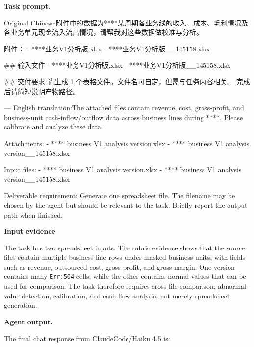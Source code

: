 \documentclass{llmxive}
\providecommand{\inlinett}[1]{{\footnotesize\texttt{#1}}}
\providecommand{\caseheader}[1]{\noindent\colorbox{fbcaseblue}{\parbox{0.96\linewidth}{\bfseries #1}}\vspace{0.5mm}\newline}
\begin{document}
\caseheader{Task prompt.}
\begin{casebox}\scriptsize
\begin{caselines}
Original Chinese:\nopagebreak[4]
附件中的数据为****某周期各业务线的收入、成本、毛利情况及各业务单元现金流入流出情况，请帮我对这些数据做校准与分析。

附件：
- ****业务V1分析版.xlsx
- ****业务V1分析版\_\_145158.xlsx

\#\# 输入文件
- ****业务V1分析版.xlsx
- ****业务V1分析版\_\_145158.xlsx

\#\# 交付要求
请生成 1 个表格文件。文件名可自定，但需与任务内容相关。
完成后请简短说明产物路径。

---
English translation:\nopagebreak[4]
The attached files contain revenue, cost, gross-profit, and business-unit cash-inflow/outflow data across business lines during ****. Please calibrate and analyze these data.

Attachments:
- **** business V1 analysis version.xlsx
- **** business V1 analysis version\_\_145158.xlsx

Input files:
- **** business V1 analysis version.xlsx
- **** business V1 analysis version\_\_145158.xlsx

Deliverable requirement:
Generate one spreadsheet file. The filename may be chosen by the agent but should be relevant to the task. Briefly report the output path when finished.
\end{caselines}
\end{casebox}

\caseheader{Input evidence}
The task has two spreadsheet inputs. The rubric evidence shows that the source files contain multiple business-line rows under masked business units, with fields such as revenue, outsourced cost, gross profit, and gross margin. One version contains many \inlinett{Err:504} cells, while the other contains normal values that can be used for comparison. The task therefore requires cross-file comparison, abnormal-value detection, calibration, and cash-flow analysis, not merely spreadsheet generation.

\caseheader{Agent output.}
The final chat response from ClaudeCode/Haiku 4.5 is:
\end{document}
